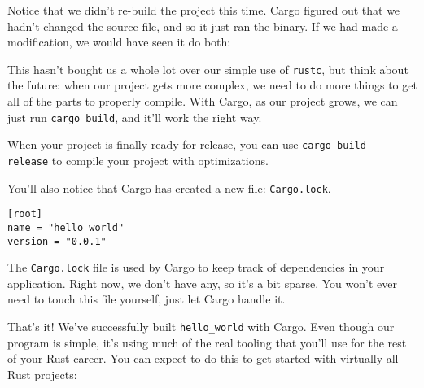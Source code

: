 \documentclass[a4paper,]{book}
\newenvironment{Shaded}{\begin{snugshade}}{\end{snugshade}}
\newcommand{\KeywordTok}[1]{\textcolor[rgb]{0.13,0.29,0.53}{\textbf{{#1}}}}
\newcommand{\NormalTok}[1]{{#1}}
\begin{document}
Notice that we didn't re-build the project this time. Cargo figured out
that we hadn't changed the source file, and so it just ran the binary.
If we had made a modification, we would have seen it do both:

\begin{Shaded}
\end{Shaded}

This hasn't bought us a whole lot over our simple use of \texttt{rustc},
but think about the future: when our project gets more complex, we need
to do more things to get all of the parts to properly compile. With
Cargo, as our project grows, we can just run \texttt{cargo\ build}, and
it'll work the right way.

When your project is finally ready for release, you can use
\texttt{cargo\ build\ -\/-release} to compile your project with
optimizations.

You'll also notice that Cargo has created a new file:
\texttt{Cargo.lock}.

\begin{verbatim}
[root]
name = "hello_world"
version = "0.0.1"
\end{verbatim}

The \texttt{Cargo.lock} file is used by Cargo to keep track of
dependencies in your application. Right now, we don't have any, so it's
a bit sparse. You won't ever need to touch this file yourself, just let
Cargo handle it.

That's it! We've successfully built \texttt{hello\_world} with Cargo.
Even though our program is simple, it's using much of the real tooling
that you'll use for the rest of your Rust career. You can expect to do
this to get started with virtually all Rust projects:

\begin{Shaded}
\end{Shaded}
\end{document}
